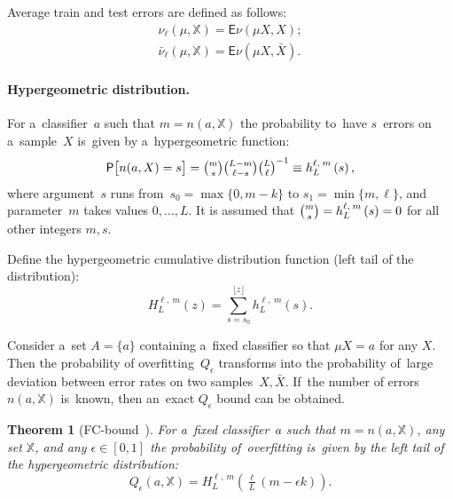 \documentclass{article} %
\def\XX{\mathbb{X}}
\newcommand{\X}{\bar X}
\def\CC_#1^#2{\tbinom{#1}{#2}}
\def\eps{\epsilon}
\providecommand{\Prob}{\mathsf{P}}
\def\Prbig[#1]{\Prob\bigl[#1\bigr]}
\newcommand{\Expect}{\mathsf{E}}
\newcommand{\hypergeom}[5]{{#1}_{#2}^{#4,\:#3}\left(#5\right)}
\newcommand{\hyper}[4]{\hypergeom{h}{#1}{#2}{#3}{#4}}
\newcommand{\Hyper}[4]{\hypergeom{H}{#1}{#2}{#3}{#4}}
\newtheorem{theorem}{Theorem}
\begin{document}
Average train and test errors are defined as follows:
\begin{gather}
    \label{eq:avgTrainNu}
    \nu_\ell(\mu, \XX) = \Expect\nu(\mu X, X);
\\
    \label{eq:avgTestNu}
    \bar \nu_\ell(\mu, \XX) = \Expect\nu(\mu X, \X).
\end{gather}

\paragraph{Hypergeometric distribution.}
For a~classifier~$a$ such that $m=n(a,\XX)$
the probability to~have $s$~errors on a~sample~$X$
is~given by a~hypergeometric function:
\[
    \Prbig[ n(a,X)=s ]
    = {\CC_m^s \CC_{L-m}^{\ell-s}} {\CC_L^\ell}^{-1}
    \equiv
    \hyper{L}{m}{\ell}{s},
\]
where
argument~$s$ runs from~${s_0 = \max\{0,m-k\}}$ to ${s_1 = \min\{m,\ell\}}$,
and parameter~$m$ takes values $0,\ldots,L$.
It is assumed that
$\CC_m^s = \hyper{L}{m}{\ell}{s} = 0$
for all other integers $m,s$.

Define the hypergeometric cumulative distribution function (left tail of the distribution):
\[
    \Hyper{L}{m}{\ell}{z}
    =
    \sum\limits_{s=s_0}^{\lfloor z \rfloor}
    \hyper{L}{m}{\ell}{s}.
\]

Consider a~set $A=\{a\}$ containing a~fixed classifier so that $\mu X = a$ for any $X$.
Then the probability of overfitting~$Q_\eps$ transforms into
the probability of~large deviation between error rates on two samples~$X,\X$.
If~the number of errors $n(a,\XX)$ is~known, then an~exact $Q_\eps$ bound can be obtained.

\begin{theorem}[FC-bound~\cite{voron11premi}]
\label{thOneAlg}
    For a~fixed classifier~$a$ such that ${m=n(a,\XX)}$,
    any set $\XX$,
    and any $\eps\in [0,1]$
    the probability of~overfitting is~given by the left tail of the hypergeometric distribution:
    \begin{equation}
    \label{eq:OCbound}
        Q_\eps(a, \XX)
        =
        \Hyper{L}{m}{\ell}{ \tfrac{\ell}{L} (m-\eps k) }.
    \end{equation}
\end{theorem}
\end{document}

